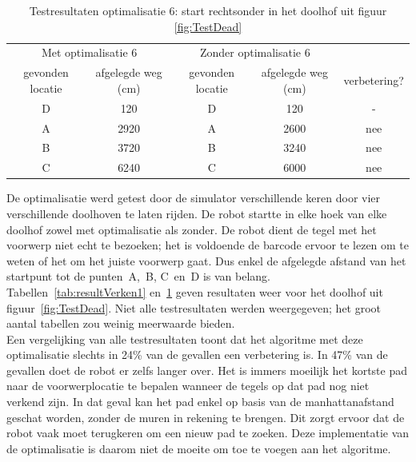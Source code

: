\documentclass[tt3]{penoverslag}
\begin{document}
\begin{table}[h]
\begin{center}
    \begin{tabular}{c | c | c | c | c}
   \multicolumn{2}{c|}{Met optimalisatie 6} & \multicolumn{2}{|c|}{Zonder optimalisatie 6} &\\
     gevonden locatie &  afgelegde weg (cm) & gevonden locatie &  afgelegde weg (cm)& verbetering?\\ \hline\hline
    D & 120 & D & 120 & -\\ \hline
    A & 2920 & A & 2600 & nee\\ \hline
    B & 3720 & B & 3240 & nee\\ \hline
    C & 6240 & C & 6000 & nee\\
    \end{tabular}
    \caption{Testresultaten optimalisatie 6: start rechtsonder in het doolhof uit figuur \ref{fig:TestDead}}
    \label{tab:resultVerken2}
\end{center}
\end{table}

De optimalisatie werd getest door de simulator verschillende keren door vier verschillende doolhoven te laten rijden. De robot startte in elke hoek van elke doolhof zowel met optimalisatie als zonder. De robot dient de tegel met het voorwerp niet echt te bezoeken; het is voldoende de barcode ervoor te lezen om te weten of het om het juiste voorwerp gaat. Dus enkel de afgelegde afstand van het startpunt tot de punten~A,~B, C~en~D is van belang. Tabellen~\ref{tab:resultVerken1} en~\ref{tab:resultVerken2} geven resultaten weer voor het doolhof uit figuur~\ref{fig:TestDead}. Niet alle testresultaten werden weergegeven; het groot aantal tabellen zou weinig meerwaarde bieden.\\

Een vergelijking van alle testresultaten toont dat het algoritme met deze optimalisatie slechts in 24\% van de gevallen een verbetering is. In 47\% van de gevallen doet de robot er zelfs langer over. Het is immers moeilijk het kortste pad naar de voorwerplocatie te bepalen wanneer de tegels op dat pad nog niet verkend zijn. In dat geval kan het pad enkel op basis van de manhattanafstand geschat worden, zonder de muren in rekening te brengen. Dit zorgt ervoor dat de robot vaak moet terugkeren om een nieuw pad te zoeken. Deze implementatie van de optimalisatie is daarom niet de moeite om toe te voegen aan het algoritme. \\
\end{document}
